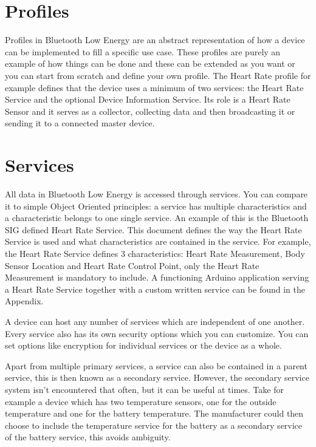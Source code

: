 \documentclass[pdftex,a4paper,12pt,twoside]{report}
\begin{document}
\section{Profiles}
\label{sec:profiles}
Profiles in Bluetooth Low Energy are an abstract representation of how a device can be implemented to fill a specific use case. These profiles are purely an example of how things can be done and these can be extended as you want or you can start from scratch and define your own profile. The Heart Rate profile for example defines that the device uses a minimum of two services: the Heart Rate Service and the optional Device Information Service. Its role is a Heart Rate Sensor and it serves as a collector, collecting data and then broadcasting it or sending it to a connected master device.

\section{Services}
\label{sec:services}
All data in Bluetooth Low Energy is accessed through services. You can compare it to simple Object Oriented principles: a service has multiple characteristics and a characteristic belongs to one single service. An example of this is the Bluetooth SIG defined Heart Rate Service. This document defines the way the Heart Rate Service is used and what characteristics are contained in the service. For example, the Heart Rate Service defines 3 characteristics: Heart Rate Measurement, Body Sensor Location and Heart Rate Control Point, only the Heart Rate Measurement is mandatory to include. A functioning Arduino application serving a Heart Rate Service together with a custom written service can be found in the Appendix.

A device can host any number of services which are independent of one another. Every service also has its own security options which you can customize. You can set options like encryption for individual services or the device as a whole.

Apart from multiple primary services, a service can also be contained in a parent service, this is then known as a secondary service. However, the secondary service system isn't encountered that often, but it can be useful at times. Take for example a device which has two temperature sensors, one for the outside temperature and one for the battery temperature. The manufacturer could then choose to include the temperature service for the battery as a secondary service of the battery service, this avoids ambiguity.
\end{document}
